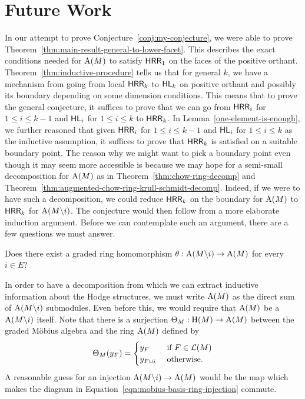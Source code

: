 \documentclass{puthesis-UG}
\begin{document}
\section{Future Work} \label{sec:future-work}

In our attempt to prove Conjecture~\ref{conj:my-conjecture}, we were able to prove Theorem~\ref{thm:main-result-general-to-lower-facet}. This describes the exact conditions needed for $\operatorname{A}(M)$ to satisfy $\mathsf{HRR}_1$ on the faces of the positive orthant. Theorem~\ref{thm:inductive-procedure} tells us that for general $k$, we have a mechanism from going from local $\mathsf{HRR}_k$ to $\mathsf{HL}_k$ on positive orthant and possibly its boundary depending on some dimension conditions. This means that to prove the general conjecture, it suffices to prove that we can go from $\mathsf{HRR}_i$ for $1 \leq i \leq k-1$ and $\mathsf{HL}_i$ for $1 \leq i \leq k$ to $\mathsf{HRR}_k$. In Lemma~\ref{one-element-is-enough}, we further reasoned that given $\mathsf{HRR}_i$ for $1 \leq i \leq k-1$ and $\mathsf{HL}_i$ for $1 \leq i \leq k$ as the inductive assumption, it suffices to prove that $\mathsf{HRR}_k$ is satisfied on a suitable boundary point. The reason why we might want to pick a boundary point even though it may seem more accessible is because we may hope for a semi-small decomposition for $\operatorname{A}(M)$ as in Theorem~\ref{thm:chow-ring-decomp} and Theorem~\ref{thm:augmented-chow-ring-krull-schmidt-decomp}. Indeed, if we were to have such a decomposition, we could reduce $\mathsf{HRR}_k$ on the boundary for $\operatorname{A}(M)$ to $\mathsf{HRR}_k$ for $\operatorname{A}(M \backslash i)$. The conjecture would then follow from a more elaborate induction argument. Before we can contemplate such an argument, there are a few questions we must answer. 
\begin{question}
	Does there exist a graded ring homomorphism $\theta : \operatorname{A}(M \backslash i) \to \operatorname{A}(M)$ for every $i \in E$? 
\end{question}
In order to have a decomposition from which we can extract inductive information about the Hodge structures, we must write $\operatorname{A}(M)$ as the direct sum of $\operatorname{A}(M \backslash i)$ submodules. Even before this, we would require that $\operatorname{A}(M)$ be a $\operatorname{A}(M \backslash i)$ itself. Note that there is a surjection $\Theta_M : \operatorname{H}(M) \to \operatorname{A}(M)$ between the graded M\"obius algebra and the ring $\operatorname{A}(M)$ defined by 
\[
	\Theta_{M}(y_F) = 
	\begin{cases}
		y_F & \text{ if $F \in \mathcal{L}(M)$} \\
		y_{F \cup i} & \text{ otherwise}.
	\end{cases}
\]
A reasonable guess for an injection $\operatorname{A}(M \backslash i) \to \operatorname{A}(M)$ would be the map which makes the diagram in Equation~\ref{eqn:mobius-basis-ring-injection} commute. 
\end{document}
